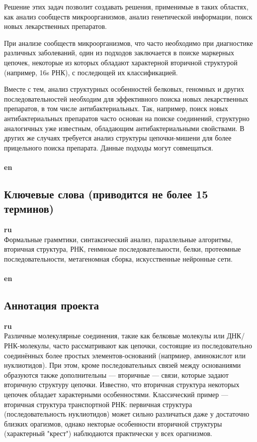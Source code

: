 \documentclass[12pt]{article}  %
\theoremstyle{remark}
\begin{document}
Решение этих задач позволит создавать решения, применимые в таких областях, как анализ сообществ микроорганизмов, анализ генетической информации, поиск новых лекарственных препаратов.

При анализе сообществ микроорганизмов, что часто необходимо при диагностике различных заболеваний, один из подходов заключается в поиске маркерных цепочек, некоторые из которых обладают характерной вторичной структурой (например, 16s РНК), с последющей их классификацией.

Вместе с тем, анализ структурных особенностей белковых, геномных и других последовательностей необходим для эффективного поиска новых лекарственных препаратов, в том числе антибактериальных. Так, например, поиск новых антибактериальных препаратов часто основан на поиске соединений, структурно аналогичных уже известным, обладающим антибактериальными свойствами. В других же случаях требуется анализ структуры цепочки-мишени для более прицельного поиска препарата. Данные подходы могут совмещаться.
\\
\\
\textbf{en}\\


\subsection{Ключевые слова (приводится не более 15 терминов)}

\textbf{ru}\\
Формальные граммтики, синтаксический анализ, параллельные алгоритмы, вторичная структура, РНК, генмноые последовательности, белки, протеомные последовательности, метагеномная сборка, искусственные нейронные сети.
\\
\\
\textbf{en}\\


\subsection{Аннотация проекта}
\textbf{ru}\\
Различные молекулярные соединения, такие как белковые молекулы или ДНК/РНК-молекулы, часто рассматривают как цепочки, состоящие из последовательно соединённых более простых элементов-оснований (напрмиер, аминокислот или нуклиотидов).
При этом, кроме последовательных связей между основаниями образуются также дополнительны --- вторичные --- связи, которые задают вторичную структуру цепочки.
Известно, что вторичная структура некоторых цепочек обладает характерными особенностями.
Классический пример --- вторичная структура транспортной РНК: первичная структура (последовательность нуклиотидов) может сильно различаться даже у достаточно близких орагизмов, однако некторые особенности вторичной структуры (характерный "крест") наблюдаются практически у всех орагнизмов.
\end{document}
